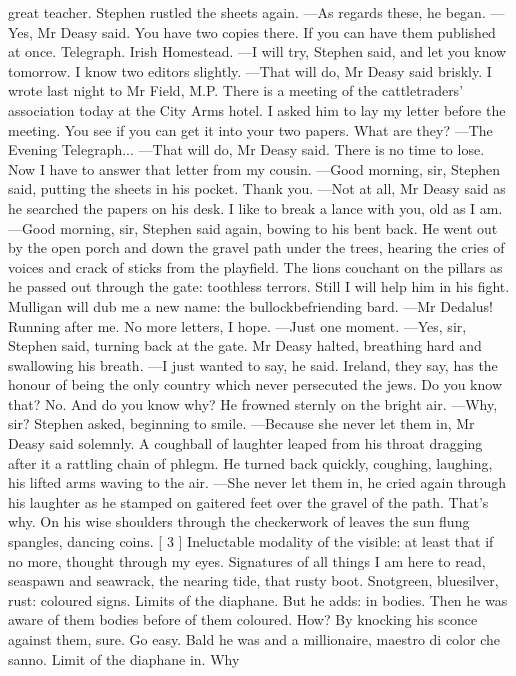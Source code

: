 \documentclass{article}
\begin{document}
great teacher.
Stephen rustled the sheets again.
—As regards these, he began.
—Yes, Mr Deasy said. You have two copies there. If you can have them
published at once.
Telegraph. Irish Homestead.
—I will try, Stephen said, and let you know tomorrow. I know two
editors slightly.
—That will do, Mr Deasy said briskly. I wrote last night to Mr Field,
M.P. There is a meeting of the cattletraders’ association today at the
City Arms hotel. I asked him to lay my letter before the meeting. You
see if you can get it into your two papers. What are they?
—The Evening Telegraph...
—That will do, Mr Deasy said. There is no time to lose. Now I have to
answer that letter from my cousin.
—Good morning, sir, Stephen said, putting the sheets in his pocket.
Thank you.
—Not at all, Mr Deasy said as he searched the papers on his desk. I
like to break a lance with you, old as I am.
—Good morning, sir, Stephen said again, bowing to his bent back.
He went out by the open porch and down the gravel path under the trees,
hearing the cries of voices and crack of sticks from the playfield.
The lions couchant on the pillars as he passed out through the gate:
toothless terrors. Still I will help him in his fight. Mulligan will dub
me a new name: the bullockbefriending bard.
—Mr Dedalus!
Running after me. No more letters, I hope.
—Just one moment.
—Yes, sir, Stephen said, turning back at the gate.
Mr Deasy halted, breathing hard and swallowing his breath.
—I just wanted to say, he said. Ireland, they say, has the honour
of being the only country which never persecuted the jews. Do you know
that? No. And do you know why?
He frowned sternly on the bright air.
—Why, sir? Stephen asked, beginning to smile.
—Because she never let them in, Mr Deasy said solemnly.
A coughball of laughter leaped from his throat dragging after it a
rattling chain of phlegm. He turned back quickly, coughing, laughing,
his lifted arms waving to the air.
—She never let them in, he cried again through his laughter as he
stamped on gaitered feet over the gravel of the path. That’s why.
On his wise shoulders through the checkerwork of leaves the sun flung
spangles, dancing coins.
[ 3 ]
Ineluctable modality of the visible: at least that if no more, thought
through my eyes. Signatures of all things I am here to read, seaspawn
and seawrack, the nearing tide, that rusty boot. Snotgreen, bluesilver,
rust: coloured signs. Limits of the diaphane. But he adds: in bodies.
Then he was aware of them bodies before of them coloured. How? By
knocking his sconce against them, sure. Go easy. Bald he was and a
millionaire, maestro di color che sanno. Limit of the diaphane in. Why
\end{document}
